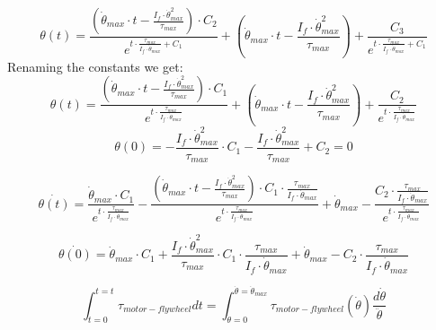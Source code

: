 \begin{enumerate}
    \begin{equation*}
        \theta(t) = \frac{(\dot{\theta}_{max} \cdot t- \frac{I_f \cdot \dot{\theta}_{max}^2}{\tau_{max}})\cdot C_2 }
        {e^{t\cdot \frac{\tau_{max}}{I_f \cdot \dot{\theta}_{max}}+C_1}} 
        + (\dot{\theta}_{max} \cdot t- \frac{I_f \cdot \dot{\theta}_{max}^2}{\tau_{max}})
        + \frac{C_3 }
        {e^{t\cdot \frac{\tau_{max}}{I_f \cdot \dot{\theta}_{max}}+C_1}}
    \end{equation*}
Renaming the constants we get:
    \begin{equation*}
        \theta(t) = \frac{(\dot{\theta}_{max} \cdot t- \frac{I_f \cdot \dot{\theta}_{max}^2}{\tau_{max}})\cdot C_1 }
        {e^{t\cdot \frac{\tau_{max}}{I_f \cdot \dot{\theta}_{max}}}} 
        + (\dot{\theta}_{max} \cdot t- \frac{I_f \cdot \dot{\theta}_{max}^2}{\tau_{max}})
        + \frac{C_2 }
        {e^{t\cdot \frac{\tau_{max}}{I_f \cdot \dot{\theta}_{max}}}}
    \end{equation*}
    \begin{equation*}
        \theta(0) = -\frac{I_f \cdot \dot{\theta}_{max}^2}{\tau_{max}}\cdot C_1 
        - \frac{I_f \cdot \dot{\theta}_{max}^2}{\tau_{max}}
        + C_2 = 0
    \end{equation*}

    \begin{equation*}
        \dot{\theta(t)} = \frac{\dot{\theta}_{max}\cdot C_1 }
        {e^{t\cdot \frac{\tau_{max}}{I_f \cdot \dot{\theta}_{max}}}} 
        -\frac{(\dot{\theta}_{max} \cdot t- \frac{I_f \cdot \dot{\theta}_{max}^2}{\tau_{max}})\cdot C_1 \cdot \frac{\tau_{max}}{I_f \cdot \dot{\theta}_{max}} }
        {e^{t\cdot \frac{\tau_{max}}{I_f \cdot \dot{\theta}_{max}}}} 
        + \dot{\theta}_{max}
        - \frac{C_2\cdot \frac{\tau_{max}}{I_f \cdot \dot{\theta}_{max}} }
        {e^{t\cdot \frac{\tau_{max}}{I_f \cdot \dot{\theta}_{max}}}}
    \end{equation*}

    
    \begin{equation*}
        \dot{\theta(0)} = \dot{\theta}_{max}\cdot C_1
        +\frac{I_f \cdot \dot{\theta}_{max}^2}{\tau_{max}}\cdot C_1 \cdot \frac{\tau_{max}}{I_f \cdot \dot{\theta}_{max}}
        + \dot{\theta}_{max}
        - C_2\cdot \frac{\tau_{max}}{I_f \cdot \dot{\theta}_{max}}
    \end{equation*}
    
    
    \[\int_{t=0}^{t=t} \tau_{motor-flywheel} dt = 
    \int_{\dot{\theta}=0}^{\dot{\theta}=\dot{\theta}_{max}} \tau_{motor-flywheel}(\dot{\theta}) \frac{d\dot{\theta}}{\ddot{\theta}} \]


\end{enumerate}
